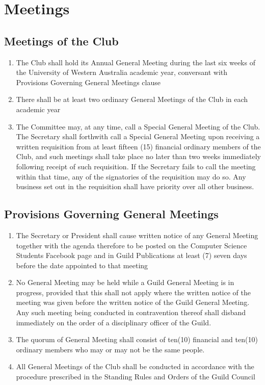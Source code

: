 \documentclass[10pt,a4paper]{report}
\begin{document}
	\chapter{Meetings}
	
	\section{Meetings of the Club}
	\begin{enumerate}[label=\alph*]
		\item The Club shall hold its Annual General Meeting during the last six weeks of the University of Western Australia academic year, conversant with Provisions Governing General Meetings clause
		\item There shall be at least two ordinary General Meetings of the Club in each academic year
		\item The Committee may, at any time, call a Special General Meeting of the Club. The Secretary shall forthwith call a Special General Meeting upon receiving a written requisition from at least fifteen (15) financial ordinary members of the Club, and such meetings shall take place no later than two weeks immediately following receipt of such requisition. If the Secretary fails to call the meeting within that time, any of the signatories of the requisition may do so. Any business set out in the requisition shall have priority over all other business.
	\end{enumerate}

	\section{Provisions Governing General Meetings}
	\begin{enumerate}[label=\alph*]
		\item The Secretary or President shall cause written notice of any General Meeting together with the agenda therefore to be posted on the Computer Science Students Facebook page and in Guild Publications at least (7) seven days before the date appointed to that meeting
		
		\item No General Meeting may be held while a Guild General Meeting is in progress, provided that this shall not apply where the written notice of the meeting was given before the written notice of the Guild General Meeting. Any such meeting being conducted in contravention thereof shall disband immediately on the order of a disciplinary officer of the Guild.
		
		\item The quorum of General Meeting shall consist of ten(10) financial and ten(10) ordinary members who may or may not be the same people.
		
		\item All General Meetings of the Club shall be conducted in accordance with the procedure prescribed in the Standing Rules and Orders of the Guild Council
	\end{enumerate}
\end{document}
